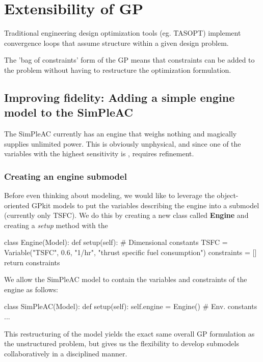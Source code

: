 \chapter{Extensibility of GP}

Traditional engineering design optimization tools (eg. TASOPT) implement convergence loops that assume structure within a given design problem. 

The 'bag of constraints' form of the GP means that constraints can be added to the problem without 
having to restructure the optimization formulation. 

\section{Improving fidelity: Adding a simple engine model to the SimPleAC}
\label{sec:engine}

The SimPleAC currently has an engine that weighs nothing and magically supplies
unlimited power. This is obviously unphysical, and since one of the variables
with the highest sensitivity is \TSFC, requires refinement.

\subsection{Creating an engine submodel}

Before even thinking about modeling, we would like to leverage the object-oriented 
GPkit models to put the variables describing the engine into a submodel (currently only 
TSFC). We do this by creating a new class called \textbf{Engine} and creating a \textit{setup}
method with the 

\begin{python}
class Engine(Model):
    def setup(self):
        # Dimensional constants
        TSFC      = Variable("TSFC", 0.6, "1/hr", "thrust specific fuel consumption")
        constraints = []
        return constraints    
\end{python}

We allow the SimPleAC model to contain the variables and constraints of the engine
as follows:

\begin{python}
class SimPleAC(Model):
    def setup(self):
        self.engine = Engine()
        # Env. constants
        ...
\end{python}

This restructuring of the model yields the exact same overall GP formulation 
as the unstructured problem, but gives us the flexibility to develop submodels
collaboratively in a disciplined manner.  

